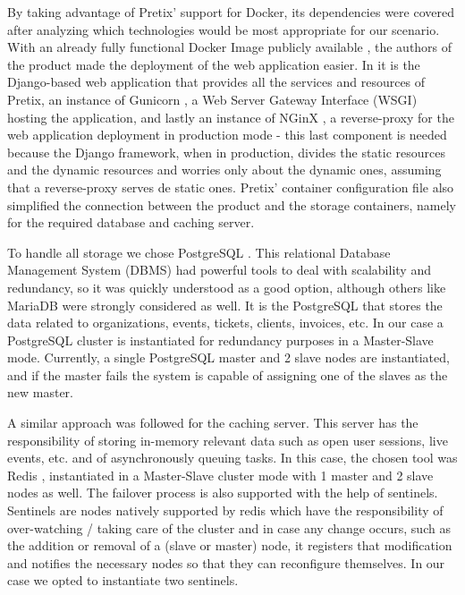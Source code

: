\documentclass[12pt]{article}
\begin{document}
By taking advantage of Pretix' support for Docker, its dependencies were covered after analyzing which technologies would be most appropriate for our scenario.
With an already fully functional Docker Image publicly available \cite{pretix_img}, the authors of the product made the deployment of the web application easier.
In it is the Django-based \cite{django} web application that provides all the services and resources of Pretix, an instance of Gunicorn \cite{gunicorn}, a 
Web Server Gateway Interface (WSGI) hosting the application, and lastly an instance of NGinX \cite{nginx}, a reverse-proxy for the web application deployment 
in production mode - this last component is needed because the Django framework, when in production, divides the static resources and the dynamic resources and 
worries only about the dynamic ones, assuming that a reverse-proxy serves de static ones. 
Pretix' container configuration file also simplified the connection between the product and the storage containers, namely for the required database and caching server.

To handle all storage we chose PostgreSQL \cite{postgresql}.
This relational Database Management System (DBMS) had powerful tools to deal with scalability and redundancy, so it was quickly understood as a good option, 
although others like MariaDB were strongly considered as well.
It is the PostgreSQL that stores the data related to organizations, events, tickets, clients, invoices, etc.
In our case a PostgreSQL cluster is instantiated for redundancy purposes in a Master-Slave mode.
Currently, a single PostgreSQL master and 2 slave nodes are instantiated, and if the master fails the system is capable of assigning one of the slaves as the 
new master.

A similar approach was followed for the caching server.
This server has the responsibility of storing in-memory relevant data such as open user sessions, live events, etc. and of asynchronously queuing tasks.
In this case, the chosen tool was Redis \cite{redis}, instantiated in a Master-Slave cluster mode with 1 master and 2 slave nodes as well. 
The failover process is also supported with the help of sentinels. 
Sentinels are nodes natively supported by redis which have the responsibility of over-watching / taking care of the cluster and in case any change occurs, 
such as the addition or removal of a (slave or master) node, it registers that modification and notifies the necessary nodes so that they can reconfigure themselves. 
In our case we opted to instantiate two sentinels. \\
\end{document}
